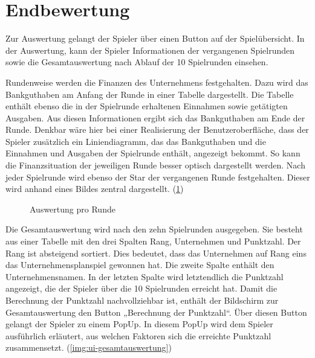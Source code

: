 \section{Endbewertung}
\label{sec:ui-endbewertung}

Zur Auswertung gelangt der Spieler über einen Button auf der Spielübersicht. In der Auswertung, kann der Spieler Informationen der vergangenen Spielrunden sowie die Gesamtauswertung nach Ablauf der 10 Spielrunden einsehen.
 
Rundenweise werden die Finanzen des Unternehmens festgehalten. Dazu wird das Bankguthaben am Anfang der Runde in einer Tabelle dargestellt. Die Tabelle enthält ebenso die in der Spielrunde erhaltenen Einnahmen sowie getätigten Ausgaben. Aus diesen Informationen ergibt sich das Bankguthaben am Ende der Runde. Denkbar wäre hier bei einer Realisierung der Benutzeroberfläche, dass der Spieler zusätzlich ein Liniendiagramm, das das Bankguthaben und die Einnahmen und Ausgaben der Spielrunde enthält, angezeigt bekommt. So kann die Finanzsituation der jeweiligen Runde besser optisch dargestellt werden. Nach jeder Spielrunde wird ebenso der Star der vergangenen Runde festgehalten. Dieser wird anhand eines Bildes zentral dargestellt. (\ref{img:ui-auswertung})

\begin{figure}[ht]
  \centering
  \caption{Auswertung pro Runde}
  \label{img:ui-auswertung}
\end{figure}
 
Die Gesamtauswertung wird nach den zehn Spielrunden ausgegeben. Sie besteht aus einer Tabelle mit den drei Spalten Rang, Unternehmen und Punktzahl.  Der Rang ist absteigend sortiert. Dies bedeutet, dass das Unternehmen auf Rang eins das Unternehmensplanspiel gewonnen hat. Die zweite Spalte enthält den Unternehmensnamen. In der letzten Spalte wird letztendlich die Punktzahl angezeigt, die der Spieler über die 10 Spielrunden erreicht hat. Damit die Berechnung der Punktzahl nachvollziehbar ist, enthält der Bildschirm zur Gesamtauswertung den Button „Berechnung der Punktzahl“. Über diesen Button gelangt der Spieler zu einem PopUp. In diesem PopUp wird dem Spieler ausführlich erläutert, aus welchen Faktoren sich die erreichte Punktzahl zusammensetzt. (\ref{img:ui-gesamtauswertung})

